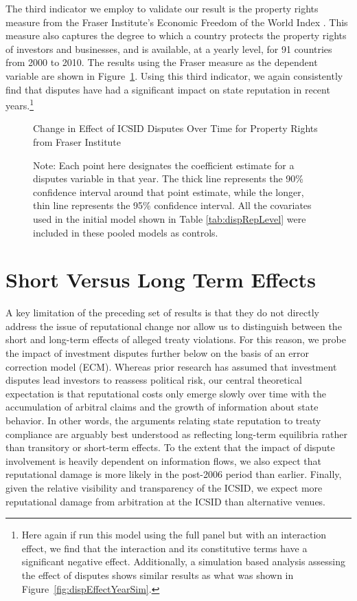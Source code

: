 \documentclass[12pt,onesided]{amsart}
\begin{document}
The third indicator we employ to validate our result is the property rights measure from the Fraser Institute's Economic Freedom of the World Index \citep{gwartney:lawson:2004}. This measure also captures the degree to which a country protects the property rights of investors and businesses, and is available, at a yearly level, for 91 countries from 2000 to 2010. The results using the Fraser measure as the dependent variable are shown in Figure~\ref{fig:dispEffectYear_fraser}. Using this third indicator, we again consistently find that disputes have had a significant impact on state reputation in recent years.\footnote{Here again if run this model using the full panel but with an interaction effect, we find that the interaction and its constitutive terms have a significant negative effect. Additionally, a simulation based analysis assessing the effect of disputes shows similar results as what was shown in Figure~\ref{fig:dispEffectYearSim}.} 

\begin{figure}[ht]
	\centering
	\caption{Change in Effect of ICSID Disputes Over Time for Property Rights from Fraser Institute}
	\label{fig:dispEffectYear_fraser}
	\resizebox{1\textwidth}{!}{}
	\caption*{Note: Each point here designates the coefficient estimate for a disputes variable in that year. The thick line represents the 90\% confidence interval around that point estimate, while the longer, thin line represents the 95\% confidence interval. All the covariates used in the initial model shown in Table \ref{tab:dispRepLevel} were included in these pooled models as controls.}
\end{figure}
\FloatBarrier

\section*{Short Versus Long Term Effects}

A key limitation of the preceding set of results is that they do not directly address the issue of reputational change nor allow us to distinguish between the short and long-term effects of alleged treaty violations. For this reason, we probe the impact of investment disputes further below on the basis of an error correction model (ECM). Whereas prior research has assumed that investment disputes lead investors to reassess political risk, our central theoretical expectation is that reputational costs only emerge slowly over time with the accumulation of arbitral claims and the growth of information about state behavior. In other words, the arguments relating state reputation to treaty compliance are arguably best understood as reflecting long-term equilibria rather than transitory or short-term effects. To the extent that the impact of dispute involvement is heavily dependent on information flows, we also expect that reputational damage is more likely in the post-2006 period than earlier. Finally, given the relative visibility and transparency of the ICSID, we expect more reputational damage from arbitration at the ICSID than alternative venues.
\end{document}
